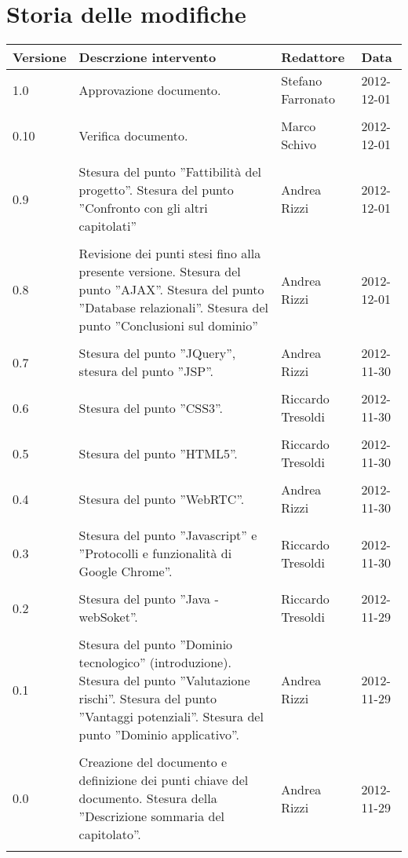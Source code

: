 \section*{Storia delle modifiche}
\begin{tabularx}{\textwidth}{lXll}
\toprule
Versione & Descrzione intervento & Redattore & Data\\
\midrule %
1.0 & Approvazione documento. & Stefano Farronato & 2012-12-01\\\\
0.10 & Verifica documento. & Marco Schivo & 2012-12-01\\\\
0.9 & Stesura del punto ''Fattibilità del progetto''. Stesura del punto ''Confronto con gli altri capitolati'' & Andrea Rizzi & 2012-12-01\\\\
0.8 & Revisione dei punti stesi fino alla presente versione. Stesura del punto ''AJAX''. Stesura del punto ''Database relazionali''. Stesura del punto ''Conclusioni sul dominio'' & Andrea Rizzi & 2012-12-01\\\\
0.7 & Stesura del punto ''JQuery'', stesura del punto ''JSP''. & Andrea Rizzi & 2012-11-30\\\\
0.6 & Stesura del punto ''CSS3''. & Riccardo Tresoldi & 2012-11-30\\\\
0.5 & Stesura del punto ''HTML5''. & Riccardo Tresoldi& 2012-11-30\\\\
0.4 & Stesura del punto ''WebRTC''. & Andrea Rizzi & 2012-11-30\\\\
0.3 & Stesura del punto ''Javascript'' e ''Protocolli e funzionalità di Google Chrome''.  & Riccardo Tresoldi & 2012-11-30\\\\
0.2 & Stesura del punto ''Java - webSoket''.  & Riccardo Tresoldi & 2012-11-29\\\\
0.1 & Stesura del punto ''Dominio tecnologico'' (introduzione). Stesura del punto ''Valutazione rischi''. Stesura del punto ''Vantaggi potenziali''. Stesura del punto ''Dominio applicativo''.  & Andrea Rizzi & 2012-11-29\\\\
0.0 & Creazione del documento e definizione dei punti chiave del documento. Stesura della ''Descrizione sommaria del capitolato''. & Andrea Rizzi & 2012-11-29\\\\
\bottomrule
\end{tabularx}
\newpage

